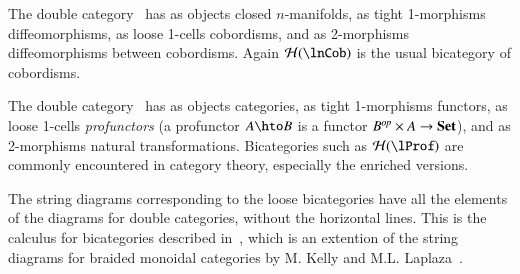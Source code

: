 \begin{eg}
  The double category \lnCob\ has as objects closed $n$-manifolds, as
  tight 1-morphisms diffeomorphisms, as loose 1-cells cobordisms, and as
  2-morphisms diffeomorphisms between cobordisms.  Again $\cH(\lnCob)$
  is the usual bicategory of cobordisms.
\end{eg}

\begin{eg}
  The double category \lProf\ has as objects categories, as
  tight 1-morphisms functors, as loose 1-cells \emph{profunctors} (a profunctor
  $A\hto B$ is a functor $B^{\mathit{op}}\times A\to \mathbf{Set}$), and as
  2-morphisms natural transformations.  Bicategories such as
  $\cH(\lProf)$ are commonly encountered in category theory,
  especially the enriched versions.
\end{eg}


The string diagrams corresponding to the loose bicategories have all the elements of the diagrams for double categories, without the horizontal lines. This is the calculus for bicategories described in~\cite{bms}, which is an extention of the string diagrams for braided monoidal categories by M. Kelly and M.L. Laplaza~\cite{kellylaplaza}.

